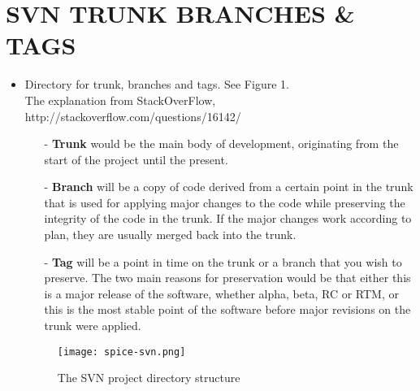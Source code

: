 \documentclass{article}
\begin{document}
\section{SVN TRUNK BRANCHES \& TAGS}
\begin{itemize}
\item
	Directory for trunk, branches and tags. See Figure 1. \\
	The explanation from StackOverFlow, http://stackoverflow.com/questions/16142/
	\begin{itemize}
	\item[-]
    \textbf{Trunk} would be the main body of development, originating from the start of the project until the present.
	\item[-]
    \textbf{Branch} will be a copy of code derived from a certain point in the trunk that is used for applying major changes to the code while preserving the integrity of the code in the trunk. If the major changes work according to plan, they are usually merged back into the trunk.
	\item[-]
    \textbf{Tag} will be a point in time on the trunk or a branch that you wish to preserve. The two main reasons for preservation would be that either this is a major release of the software, whether alpha, beta, RC or RTM, or this is the most stable point of the software before major revisions on the trunk were applied.
	\end{itemize}
	
\begin{figure}[h]
\label{fig:fig_svn}
\begin{center}
\texttt{[image: spice-svn.png]}
\caption{The SVN project directory structure}
\end{center}
\end{figure}	
	

\end{itemize}
\end{document}

